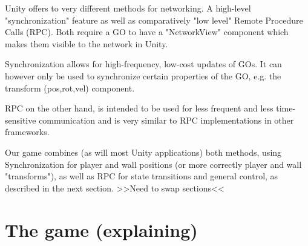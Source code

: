 \documentclass{report}
\newcommand{\lfig}[1]{\label{fig:#1}}
\begin{document}
Unity offers to very different methods for networking.
A high-level "synchronization" feature as well as comparatively "low level"  Remote Procedure Calls (RPC).
Both require a GO to have a "NetworkView" component which makes them visible to the network in Unity.

Synchronization allows for high-frequency, low-cost updates  of GOs. It can however only be used to synchronize certain properties of the GO, e.g. the transform (pos,rot,vel) component.

RPC on the other hand, is intended to be used for less frequent and less time-sensitive communication and is very similar to RPC implementations in other frameworks.

Our game combines (as will most Unity applications) both methods, using Synchronization for player and wall positions (or more correctly player and wall "transforms"), as well as RPC for state transitions and general control, as described in the next section. >>Need to swap sections<<





\section{The game (explaining) }
\end{document}
